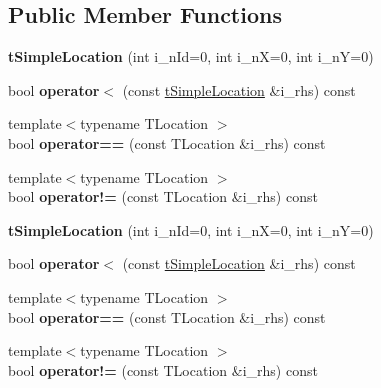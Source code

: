 \subsection*{Public Member Functions}
\begin{DoxyCompactItemize}
\item 
\mbox{\label{structplanner_1_1t_simple_location_a5d8f6cbf74298ad6e80ac04f8155ece2}} 
{\bfseries t\+Simple\+Location} (int i\+\_\+n\+Id=0, int i\+\_\+nX=0, int i\+\_\+nY=0)
\item 
\mbox{\label{structplanner_1_1t_simple_location_afa78b07e810b294b1cfd1a81379a92d3}} 
bool {\bfseries operator$<$} (const \mbox{\hyperlink{structplanner_1_1t_simple_location}{t\+Simple\+Location}} \&i\+\_\+rhs) const
\item 
\mbox{\label{structplanner_1_1t_simple_location_a1231d9a6478b58ed3f4c272067e67416}} 
{\footnotesize template$<$typename T\+Location $>$ }\\bool {\bfseries operator==} (const T\+Location \&i\+\_\+rhs) const
\item 
\mbox{\label{structplanner_1_1t_simple_location_a76cc36fbdc32b448900cf5353e139dea}} 
{\footnotesize template$<$typename T\+Location $>$ }\\bool {\bfseries operator!=} (const T\+Location \&i\+\_\+rhs) const
\item 
\mbox{\label{structplanner_1_1t_simple_location_a5d8f6cbf74298ad6e80ac04f8155ece2}} 
{\bfseries t\+Simple\+Location} (int i\+\_\+n\+Id=0, int i\+\_\+nX=0, int i\+\_\+nY=0)
\item 
\mbox{\label{structplanner_1_1t_simple_location_afa78b07e810b294b1cfd1a81379a92d3}} 
bool {\bfseries operator$<$} (const \mbox{\hyperlink{structplanner_1_1t_simple_location}{t\+Simple\+Location}} \&i\+\_\+rhs) const
\item 
\mbox{\label{structplanner_1_1t_simple_location_a1231d9a6478b58ed3f4c272067e67416}} 
{\footnotesize template$<$typename T\+Location $>$ }\\bool {\bfseries operator==} (const T\+Location \&i\+\_\+rhs) const
\item 
\mbox{\label{structplanner_1_1t_simple_location_a76cc36fbdc32b448900cf5353e139dea}} 
{\footnotesize template$<$typename T\+Location $>$ }\\bool {\bfseries operator!=} (const T\+Location \&i\+\_\+rhs) const
\end{DoxyCompactItemize}
